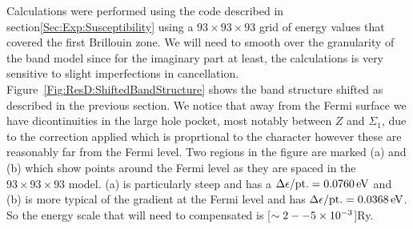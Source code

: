 Calculations were performed using the  code described in section\ref{Sec:Exp:Susceptibility} using a $93\times93\times93$ grid of energy values that covered the first Brillouin zone. We will need to smooth over the granularity of the \WIEN band model since for the imaginary part at least, the calculations is very sensitive to slight imperfections in cancellation. Figure~\ref{Fig:ResD:ShiftedBandStructure} shows the band structure shifted as described in the previous section. We notice that away from the Fermi surface we have dicontinuities in the large hole pocket, most notably between $Z$ and $\Sigma_1$, due to the correction applied which is proprtional to the \DzTwo character however these are reasonably far from the Fermi level. Two regions in the figure are marked (a) and (b) which show points around the Fermi level as they are spaced in the $93\times93\times93$ model. (a) is particularly steep and has a $\Delta \epsilon/\textrm{pt.} = \unit[0.0760]{eV}$ and (b) is more typical of the gradient at the Fermi level and has $\Delta \epsilon/\textrm{pt.} = \unit[0.0368]{eV}$. So the energy scale that will need to compensated is \unit[$\sim 2--5\times 10^{-3}$]{Ry}.
